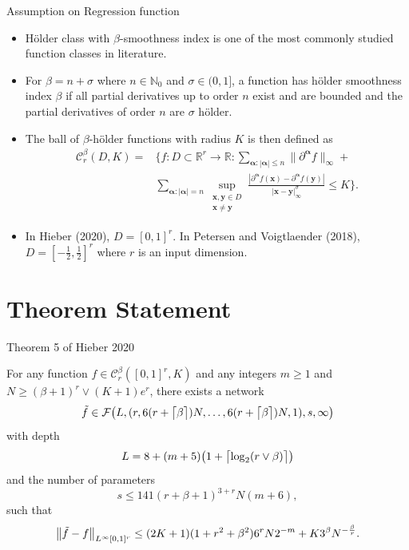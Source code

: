 \documentclass{if-beamer}
\DeclarePairedDelimiter{\ceil}{\lceil}{\rceil}
\begin{document}
\begin{frame}{Assumption on Regression function}
\begin{itemize}
    \item H\"older class with $\beta$-smoothness index is one of the most commonly studied function classes in literature.
    \item For $\beta=n+\sigma$ where $n \in \mathbb{N}_{0}$ and $\sigma \in (0,1]$, a function has h\"older smoothness index $\beta$ if all partial derivatives up to order $n$ exist and are bounded and the partial derivatives of order $n$ are $\sigma$ h\"older.
    \item The ball of $\beta$-h\"older functions with radius $K$ is then defined as 
        \begin{eqnarray*}
            \mathcal{C}_{r}^{\beta}(D,K) = &\bigg\{ f : D\subset \mathbb{R}^{r} \rightarrow{\mathbb{R}} : 
            \sum_{\boldsymbol{\alpha}:|\boldsymbol{\alpha}|\leq n} \|\partial^{\boldsymbol{\alpha}}{f}\|_{\infty} + \\ &\sum_{\boldsymbol{\alpha}:|\boldsymbol{\alpha}|=n} \sup_{\substack{\boldsymbol{x}, \boldsymbol{y} \in D \\ \boldsymbol{x} \ne \boldsymbol{y}}} \frac{|\partial^{\boldsymbol{\alpha}}f(\boldsymbol{x}) - \partial^{\boldsymbol{\alpha}}f(\boldsymbol{y})|}{|\boldsymbol{x}-\boldsymbol{y}|_{\infty}^{\sigma}} \leq K \bigg\}. \nonumber
        \end{eqnarray*}
    \item In Hieber (2020), $D=[0,1]^{r}$. In Petersen and Voigtlaender (2018), $D=[-\frac{1}{2},\frac{1}{2}]^{r}$ where $r$ is an input dimension.
\end{itemize}
\end{frame}

\section{Theorem Statement}
\begin{frame}{Theorem 5 of Hieber 2020}
\begin{tcolorbox}
    For any function $f\in\mathcal{C}_{r}^{\beta}([0,1]^{r},K)$ and any integers $m\geq 1$ and $N\geq(\beta+1)^{r} \vee (K+1)e^{r}$, there exists a network 
    \begin{equation*}
        \Tilde{f}\in\mathcal{F}\big(L,(r,6(r+\ceil[\big]{\beta})N,\dots,6(r+\ceil[\big]{\beta})N,1),s,\infty\big)
    \end{equation*}
    with depth
    \begin{equation*}
        L=8+(m+5)\big(1+\ceil[\big]{\log_{2}(r\vee\beta)}\big)
    \end{equation*}
    and the number of parameters 
    \begin{equation*}
        s\leq 141(r+\beta+1)^{3+r}N(m+6),
    \end{equation*}
    such that
    \begin{equation*}
        \left\|\Tilde{f}-f\right\|_{L^\infty[0,1]^{r}}\leq (2K+1)(1+r^{2}+\beta^{2})6^{r}N2^{-m}+K3^{\beta}N^{-\frac{\beta}{r}}.
    \end{equation*}
\end{tcolorbox}
\end{frame}
\end{document}
